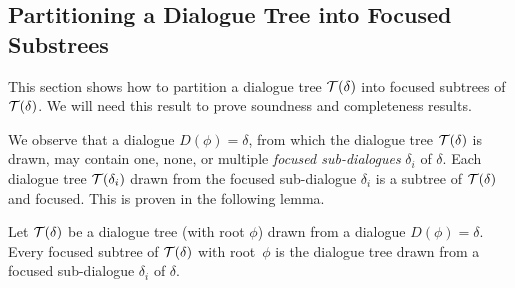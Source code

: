 
\subsection{Partitioning a Dialogue Tree into Focused Substrees}
\label{app:partition}
This section shows how to partition a dialogue tree $\mathcal{T}(\delta)$ into focused subtrees of $\mathcal{T}(\delta)$. We will need this result to prove soundness and completeness results.

We observe that a dialogue $D(\phi) = \delta$, from which the dialogue tree $\mathcal{T}(\delta)$ is drawn, may contain one, none, or multiple \emph{focused sub-dialogues} $\delta_i$ of $\delta$. Each dialogue tree $\mathcal{T}(\delta_i)$ drawn from the focused sub-dialogue $\delta_i$ is a subtree of $\mathcal{T}(\delta)$ and focused. This is proven in the following lemma.

\begin{lemma}
     \label{lem:DT-subT} 
     Let $\mathcal{T}(\delta)$ be a dialogue tree (with root $\phi$) drawn from a dialogue $D(\phi) = \delta$. 
     Every focused subtree of $\mathcal{T}(\delta)$ with root~$\phi$ is the dialogue tree
     drawn from a focused sub-dialogue $\delta_i$ of $\delta$.
\end{lemma}

